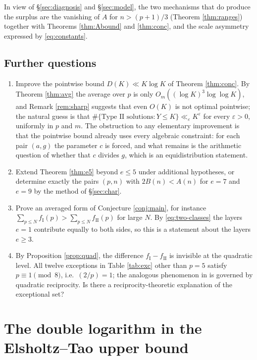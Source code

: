 \documentclass[11pt,reqno]{amsart}
\theoremstyle{plain}
\theoremstyle{definition}
\numberwithin{equation}{section}
\newcommand{\fI}{f_{\mathrm{I}}}
\newcommand{\fII}{f_{\mathrm{II}}}
\begin{document}
In view of \S\ref{sec:diagnosis} and \S\ref{sec:model}, the two mechanisms that do
produce the surplus are the vanishing of $A$ for $n>(p+1)/3$ (Theorem
\ref{thm:ranges}) together with Theorems \ref{thm:Abound} and \ref{thm:conc}, and the
scale asymmetry expressed by \eqref{eq:constants}.

\subsection{Further questions}
\begin{enumerate}
\item Improve the pointwise bound $D(K)\ll K\log K$ of Theorem \ref{thm:conc}. By
Theorem \ref{thm:avg} the average over $p$ is only $O_{m}((\log K)^{3}\log\log K)$, and
Remark \ref{rem:sharp} suggests that even $O(K)$ is not optimal pointwise; the natural
guess is that $\#\{\text{Type II solutions}:Y\le K\}\ll_{\varepsilon}K^{\varepsilon}$ for
every $\varepsilon>0$, uniformly in $p$ and $m$. The obstruction to any elementary
improvement is that the pointwise bound already uses every algebraic constraint: for
each pair $(a,g)$ the parameter $c$ is forced, and what remains is the arithmetic
question of whether that $c$ divides $g$, which is an equidistribution statement.
\item Extend Theorem \ref{thm:e5} beyond $e\le5$ under additional hypotheses, or
determine exactly the pairs $(p,n)$ with $2B(n)<A(n)$ for $e=7$ and $e=9$ by the
method of \S\ref{sec:char}.
\item Prove an averaged form of Conjecture \ref{conj:main}, for instance
$\sum_{p\le N}\fI(p)>\sum_{p\le N}\fII(p)$ for large $N$. By \eqref{eq:two-classes}
the layers $e=1$ contribute equally to both sides, so this is a statement about the
layers $e\ge3$.
\item By Proposition \ref{prop:quad}, the difference $\fI-\fII$ is invisible at the
quadratic level. All twelve exceptions in Table \ref{tab:exc} other than $p=5$
satisfy $p\equiv1\pmod8$, i.e.\ $(2/p)=1$; the analogous phenomenon in
\cite[Prop.~1.6]{ElsholtzTao} is governed by quadratic reciprocity. Is there a
reciprocity-theoretic explanation of the exceptional set?
\end{enumerate}

\section{The double logarithm in the Elsholtz--Tao upper bound}\label{sec:loglog}
\end{document}
